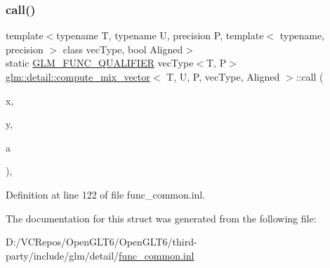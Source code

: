 \subsubsection{\texorpdfstring{call()}{call()}}
{\footnotesize\ttfamily template$<$typename T, typename U, precision P, template$<$ typename, precision $>$ class vec\+Type, bool Aligned$>$ \\
static \mbox{\hyperlink{setup_8hpp_a33fdea6f91c5f834105f7415e2a64407}{G\+L\+M\+\_\+\+F\+U\+N\+C\+\_\+\+Q\+U\+A\+L\+I\+F\+I\+ER}} vec\+Type$<$T, P$>$ \mbox{\hyperlink{structglm_1_1detail_1_1compute__mix__vector}{glm\+::detail\+::compute\+\_\+mix\+\_\+vector}}$<$ T, U, P, vec\+Type, Aligned $>$\+::call (\begin{DoxyParamCaption}\item[{vec\+Type$<$ T, P $>$ const \&}]{x,  }\item[{vec\+Type$<$ T, P $>$ const \&}]{y,  }\item[{vec\+Type$<$ U, P $>$ const \&}]{a }\end{DoxyParamCaption})\hspace{0.3cm}{\ttfamily [inline]}, {\ttfamily [static]}}



Definition at line 122 of file func\+\_\+common.\+inl.



The documentation for this struct was generated from the following file\+:\begin{DoxyCompactItemize}
\item 
D\+:/\+V\+C\+Repos/\+Open\+G\+L\+T6/\+Open\+G\+L\+T6/third-\/party/include/glm/detail/\mbox{\hyperlink{func__common_8inl}{func\+\_\+common.\+inl}}\end{DoxyCompactItemize}
